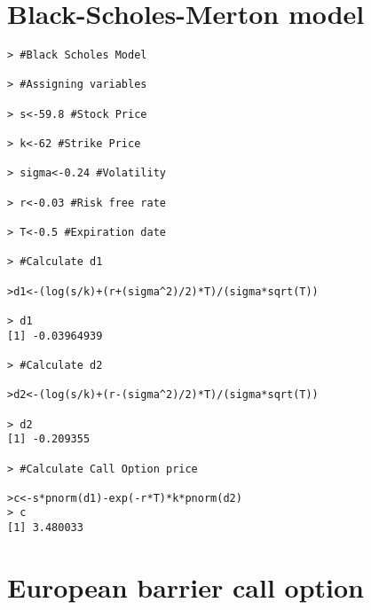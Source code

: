 \section{Black-Scholes-Merton model}
\begin{lstlisting}
> #Black Scholes Model

> #Assigning variables

> s<-59.8 #Stock Price

> k<-62 #Strike Price

> sigma<-0.24 #Volatility

> r<-0.03 #Risk free rate

> T<-0.5 #Expiration date

> #Calculate d1

>d1<-(log(s/k)+(r+(sigma^2)/2)*T)/(sigma*sqrt(T))

> d1
[1] -0.03964939

> #Calculate d2

>d2<-(log(s/k)+(r-(sigma^2)/2)*T)/(sigma*sqrt(T))

> d2
[1] -0.209355

> #Calculate Call Option price

>c<-s*pnorm(d1)-exp(-r*T)*k*pnorm(d2)
> c
[1] 3.480033
\end{lstlisting}

\newpage
\section{European barrier call option}

